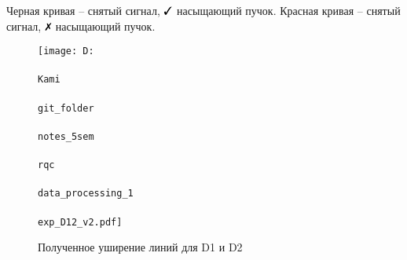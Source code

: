 Черная кривая -- снятый сигнал, $\cmark$ насыщающий пучок.
Красная кривая -- снятый сигнал, $\xmark$ насыщающий пучок.




\begin{figure}[h!]
    \centering
    \texttt{[image: D:\\\\Kami\\\\git\_folder\\\\notes\_5sem\\\\rqc\\\\data\_processing\_1\\\\exp\_D12\_v2.pdf]}
    \caption{Полученное уширение линий для D1 и D2}
    \label{fig:expD12}
\end{figure}

